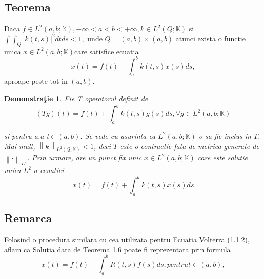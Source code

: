\documentclass[a4paper,12pt,oneside]{report}
\newtheorem{demonstration}{Demonstra\c tie}
\begin{document}
	\subsection{Teorema }
					
	Daca \(f\in L^{2}\left ( a,b;\mathbb{K} \right ), -\infty < a< b< +\infty , k\in L^{2}\left ( Q; \mathbb{K} \right )\) si \(\int \int _{Q}\left | k\left ( t,s \right ) \right |^{2}dtds< 1,\) unde \(Q = \left ( a,b \right )\times \left ( a,b \right )\) atunci exista o functie unica \(x\in L^{2} \left ( a,b;\mathbb{K} \right ) \)care satisfice ecuatia
	\begin{displaymath}
		x\left ( t \right ) = f\left ( t \right ) + \int_{a}^{b}k\left ( t,s \right )x\left ( s \right )ds, 
	\end{displaymath}
	aproape peste tot in \(\left ( a,b  \right )\). 
					
					
					
	\begin{demonstration}
		Fie T operatorul definit de 
		\begin{displaymath}
			\left ( Tg \right )\left ( t \right ) = f\left ( t \right ) + \int_{a}^{b}k\left ( t,s \right )g\left ( s \right )ds, \forall g\in L^{2}\left ( a,b;\mathbb{K} \right )
		\end{displaymath}
										
		si pentru a.a t\(\in \left ( a,b \right )\).
		Se vede cu usurinta ca \(L^{2}\left ( a,b;\mathbb{K} \right )\) o sa fie inclus in \(T\). Mai mult, \(\left \| k \right \|_{L^{2}\left ( Q, \mathbb{K} \right )}< 1\), deci \(T\) este o contractie fata de metrica generate de \(\left \| \cdot  \right \|_{L^{2}}\). Prin urmare, are un punct fix unic \(x\in L^{2}\left ( a,b;\mathbb{K} \right )\) care este solutie unica \(L^{2}\) a ecuatiei
		\begin{displaymath}
			x\left ( t \right ) = f\left ( t \right ) + \int_{a}^{b}k\left ( t,s \right )x\left ( s \right )ds
		\end{displaymath}
										
	\end{demonstration}
					
	\subsection{Remarca}
					
	Folosind o procedura similara cu cea utilizata pentru Ecuatia Volterra (1.1.2), aflam ca Solutia data de Teorema 1.6 poate fi reprezentata prin formula 
	\begin{displaymath}
		x\left ( t \right ) = f\left ( t \right ) + \int_{a}^{b}R\left ( t,s \right )f\left ( s \right )ds, pentru t\in \left ( a,b \right ),
	\end{displaymath}
					
\end{document}
